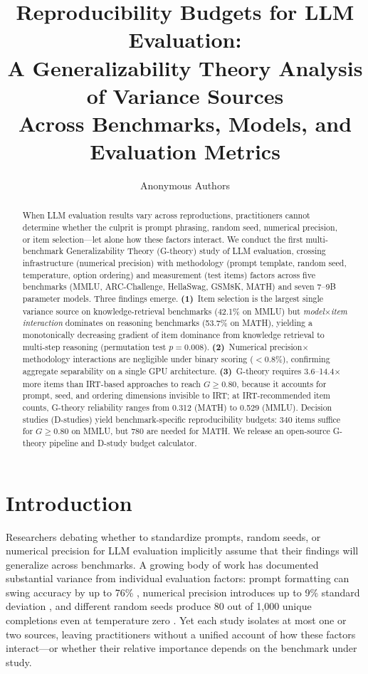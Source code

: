 \documentclass[letterpaper,11pt]{article}
\title{Reproducibility Budgets for LLM Evaluation:\\A Generalizability Theory Analysis of Variance Sources\\Across Benchmarks, Models, and Evaluation Metrics}
\author{
Anonymous Authors
}
\begin{document}
\maketitle

\begin{abstract}
When LLM evaluation results vary across reproductions, practitioners cannot determine whether the culprit is prompt phrasing, random seed, numerical precision, or item selection---let alone how these factors interact.
We conduct the first multi-benchmark Generalizability Theory (G-theory) study of LLM evaluation, crossing infrastructure (numerical precision) with methodology (prompt template, random seed, temperature, option ordering) and measurement (test items) factors across five benchmarks (MMLU, ARC-Challenge, HellaSwag, GSM8K, MATH) and seven 7--9B parameter models.
Three findings emerge.
\textbf{(1)}~Item selection is the largest single variance source on knowledge-retrieval benchmarks (42.1\% on MMLU) but \emph{model$\times$item interaction} dominates on reasoning benchmarks (53.7\% on MATH), yielding a monotonically decreasing gradient of item dominance from knowledge retrieval to multi-step reasoning (permutation test $p=0.008$).
\textbf{(2)}~Numerical precision$\times$methodology interactions are negligible under binary scoring ($<$0.8\%), confirming aggregate separability on a single GPU architecture.
\textbf{(3)}~G-theory requires 3.6--14.4$\times$ more items than IRT-based approaches to reach $G\geq0.80$, because it accounts for prompt, seed, and ordering dimensions invisible to IRT; at IRT-recommended item counts, G-theory reliability ranges from 0.312 (MATH) to 0.529 (MMLU).
Decision studies (D-studies) yield benchmark-specific reproducibility budgets: 340 items suffice for $G\geq0.80$ on MMLU, but 780 are needed for MATH.
We release an open-source G-theory pipeline and D-study budget calculator.
\end{abstract}

\section{Introduction}

Researchers debating whether to standardize prompts, random seeds, or numerical precision for LLM evaluation implicitly assume that their findings will generalize across benchmarks.
A growing body of work has documented substantial variance from individual evaluation factors: prompt formatting can swing accuracy by up to 76\% \citep{sclar2024quantifying}, numerical precision introduces up to 9\% standard deviation \citep{yuan2025llminference}, and different random seeds produce 80 out of 1,000 unique completions even at temperature zero \citep{thinkingmachines2025}.
Yet each study isolates at most one or two sources, leaving practitioners without a unified account of how these factors interact---or whether their relative importance depends on the benchmark under study.
\end{document}
